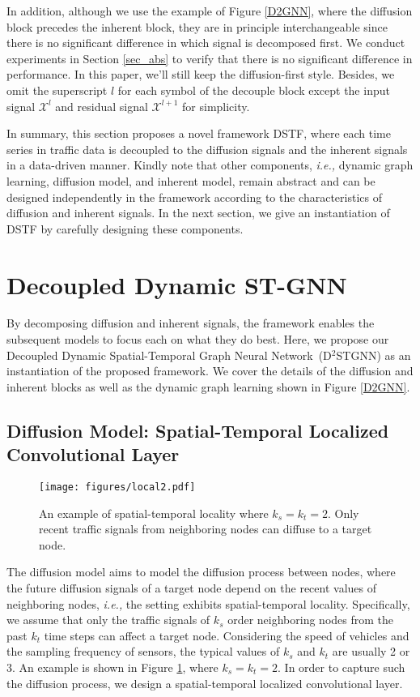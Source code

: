 \documentclass[sigconf, nonacm]{acmart}
\newcommand{\ie}{\textit{i.e.,}\xspace}
\begin{document}
{\color{black} In addition, although we use the example of Figure \ref{D2GNN}, where the diffusion block precedes the inherent block, they are in principle interchangeable since there is no significant difference in which signal is decomposed first.
We conduct experiments in Section \ref{sec_abs} to verify that there is no significant difference in performance.
In this paper, we'll still keep the diffusion-first style.
Besides, we omit the superscript ${l}$ for each symbol of the decouple block except the input signal $\mathcal{X}^{l}$ and residual signal $\mathcal{X}^{l+1}$ for simplicity.
}

{\color{black}
In summary, this section proposes a novel framework DSTF, where each time series in traffic data is decoupled to the diffusion signals and the inherent signals in a data-driven manner.
Kindly note that other components, \ie dynamic graph learning, diffusion model, and inherent model, remain abstract and can be designed independently in the framework according to the characteristics of diffusion and inherent signals.
In the next section, we give an instantiation of DSTF by carefully designing these components.
} \section{Decoupled Dynamic ST-GNN}
\label{Section5}
By decomposing {\color{black}diffusion and inherent} signals, the framework enables the {\color{black}subsequent} models to focus each on what they do best.
Here, we propose our Decoupled Dynamic Spatial-Temporal Graph Neural Network~(D$^2$STGNN) {\color{black}as an instantiation of the proposed framework}.
We cover the details of the {\color{black}diffusion and inherent blocks as well as the dynamic graph learning} shown in Figure \ref{D2GNN}.

\subsection{{\color{black}Diffusion Model: Spatial-Temporal} Localized {\color{black}Convolutional} Layer}
\begin{figure}[h]
  \centering
  \setlength{\abovecaptionskip}{0.2cm}
\texttt{[image: figures/local2.pdf]}
  \caption{An example of spatial-temporal locality {\color{black}where $k_s=k_t=2$}. Only recent traffic signals from neighboring nodes can diffuse to a target node.}
  \label{locality}
\end{figure}
The {\color{black}diffusion} model aims to model {\color{black}the diffusion process between nodes, where the future diffusion signals of a target node depend on the recent values of neighboring nodes}, \ie the setting exhibits spatial-temporal locality.
Specifically, we assume that only {\color{black}the traffic signals of} $k_s$ order neighboring nodes {\color{black}from the past $k_t$ time steps} can affect a target node.
Considering the {\color{black} speed of vehicles} and the sampling frequency of sensors, the typical values of $k_s$ and $k_t$ are usually 2 or 3.
An example is shown in Figure \ref{locality}, where $k_s=k_t=2$.
In order to capture {\color{black}such the diffusion process, we design a spatial-temporal localized {\color{black}convolutional} layer.}
\end{document}
